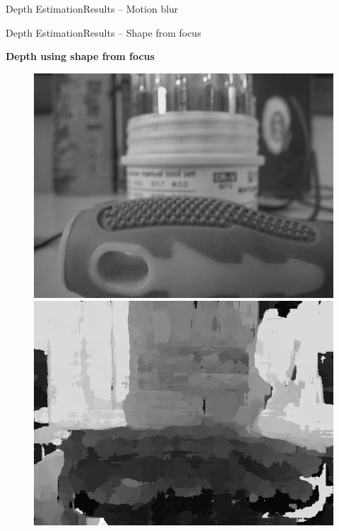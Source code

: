 \documentclass{beamer}
\begin{document}
\begin{frame}{Depth Estimation}{Results -- Motion blur}
\end{frame}

\begin{frame}{Depth Estimation}{Results -- Shape from focus}

\textbf{Depth using shape from focus}
\begin{figure}[H]
\begin{center}
\resizebox{35mm}{!} {\includegraphics {../images/focus/eg1/im3.png}}
\resizebox{35mm}{!} {\includegraphics {../images/focus/eg1/imdepth.png}}

\end{center}
\end{figure}
\end{frame}
\end{document}
